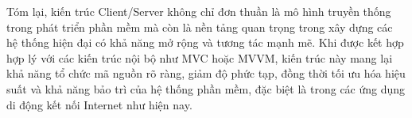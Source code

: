     \begin{flushleft}
      \hspace*{0.8cm}Tóm lại, kiến trúc Client/Server không chỉ đơn thuần là mô hình truyền thống trong phát triển phần mềm mà còn là nền tảng quan trọng trong xây dựng các hệ thống hiện đại có khả năng mở rộng và tương tác mạnh mẽ. Khi được kết hợp hợp lý với các kiến trúc nội bộ như MVC hoặc MVVM, kiến trúc này mang lại khả năng tổ chức mã nguồn rõ ràng, giảm độ phức tạp, đồng thời tối ưu hóa hiệu suất và khả năng bảo trì của hệ thống phần mềm, đặc biệt là trong các ứng dụng di động kết nối Internet như hiện nay.
    \end{flushleft}